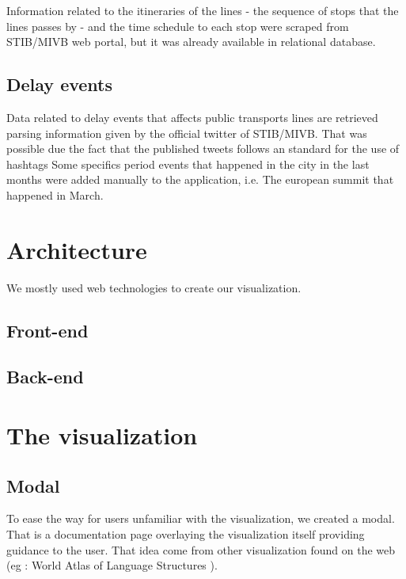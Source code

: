 \documentclass[12pt]{article}%
\begin{document}
Information related to the itineraries of the lines - the sequence of stops that the lines passes by - and the time schedule to each stop were scraped from STIB/MIVB web portal, but it was already available in relational database.

\subsection{Delay events}
Data related to delay events that affects public transports lines are retrieved parsing information given by the official twitter of STIB/MIVB. %
That was possible due the fact that the published tweets follows an standard for the use of hashtags
Some specifics period events that happened in the city in the last months were added manually to the application, i.e. The european summit that happened in March.                       
                       
\section{Architecture}
We mostly used web technologies to create our visualization.

\subsection{Front-end}

\subsection{Back-end}
 
\section{The visualization}

\subsection{Modal}

To ease the way for users unfamiliar with the visualization, we created a modal. That is a documentation page overlaying the visualization itself providing guidance to the user. That idea come from other visualization found on the web (eg : World Atlas of Language Structures \cite{visuawithmodal}).
\end{document}

